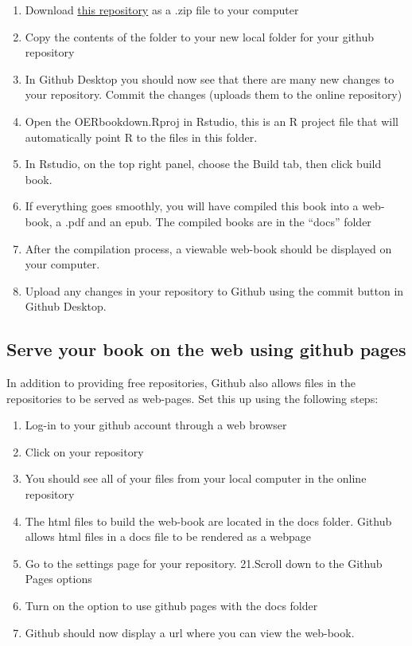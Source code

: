 \documentclass[
]{book}
\providecommand{\tightlist}{%
  \setlength{\itemsep}{0pt}\setlength{\parskip}{0pt}}
\begin{document}
\begin{enumerate}
\def\labelenumi{\arabic{enumi}.}
\setcounter{enumi}{8}
\tightlist
\item
  Download \href{https://github.com/CrumpLab/OER_bookdown}{this repository} as a .zip file to your computer
\item
  Copy the contents of the folder to your new local folder for your github repository
\item
  In Github Desktop you should now see that there are many new changes to your repository. Commit the changes (uploads them to the online repository)
\item
  Open the OERbookdown.Rproj in Rstudio, this is an R project file that will automatically point R to the files in this folder.
\item
  In Rstudio, on the top right panel, choose the Build tab, then click build book.
\item
  If everything goes smoothly, you will have compiled this book into a web-book, a .pdf and an epub. The compiled books are in the ``docs'' folder
\item
  After the compilation process, a viewable web-book should be displayed on your computer.
\item
  Upload any changes in your repository to Github using the commit button in Github Desktop.
\end{enumerate}

\hypertarget{serve-your-book-on-the-web-using-github-pages}{%
\subsection{Serve your book on the web using github pages}\label{serve-your-book-on-the-web-using-github-pages}}

In addition to providing free repositories, Github also allows files in the repositories to be served as web-pages. Set this up using the following steps:

\begin{enumerate}
\def\labelenumi{\arabic{enumi}.}
\setcounter{enumi}{15}
\tightlist
\item
  Log-in to your github account through a web browser
\item
  Click on your repository
\item
  You should see all of your files from your local computer in the online repository
\item
  The html files to build the web-book are located in the docs folder. Github allows html files in a docs file to be rendered as a webpage
\item
  Go to the settings page for your repository.
  21.Scroll down to the Github Pages options
\item
  Turn on the option to use github pages with the docs folder
\item
  Github should now display a url where you can view the web-book.
\end{enumerate}
\end{document}
